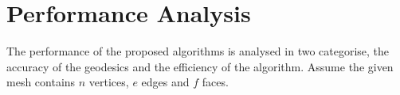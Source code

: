 %
%
%
%
%
%   




\section{Performance Analysis}
The performance of the proposed algorithms is analysed in two categorise, the accuracy of the geodesics and the efficiency of the algorithm. Assume the given mesh contains $n$ vertices, $e$ edges and $f$ faces.

